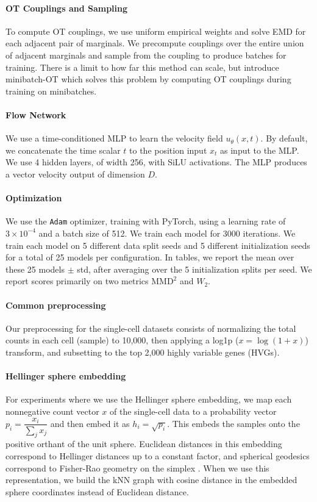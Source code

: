 \paragraph{OT Couplings and Sampling}
To compute OT couplings, we use uniform empirical weights and solve EMD for each adjacent pair of marginals. We precompute couplings over the entire union of adjacent marginals and sample from the coupling to produce batches for training. There is a limit to how far this method can scale, but \citet{tongImprovingGeneralizingFlowbased2024} introduce minibatch-OT which solves this problem by computing OT couplings during training on minibatches.

\paragraph{Flow Network}
We use a time-conditioned MLP to learn the velocity field $u_\theta(x, t)$. By default, we concatenate the time scalar $t$ to the position input $x_t$ as input to the MLP. We use 4 hidden layers, of width 256, with SiLU activations. The MLP produces a vector velocity output of dimension $D$.

\paragraph{Optimization}
We use the \texttt{Adam} optimizer, training with PyTorch, using a learning rate of $3\times 10^{-4}$ and a batch size of 512. We train each model for 3000 iterations. We train each model on 5 different data split seeds and 5 different initialization seeds for a total of 25 models per configuration. In tables, we report the mean over these 25 models $\pm$ std, after averaging over the 5 initialization splits per seed. We report scores primarily on two metrics $\mathrm{MMD}^2$ and $W_2$.

\paragraph{Common preprocessing} Our preprocessing for the single-cell datasets consists of normalizing the total counts in each cell (sample) to 10,000, then applying a log1p ($x=\log(1+x)$) transform, and subsetting to the top 2,000 highly variable genes (HVGs).

\paragraph{Hellinger sphere embedding}
For experiments where we use the Hellinger sphere embedding, we map each nonnegative count vector $x$ of the single-cell data to a probability vector $p_i=\dfrac{x_i}{\sum_j x_j}$ and then embed it as $h_i=\sqrt{p_i}$. This embeds the samples onto the positive orthant of the unit sphere. Euclidean distances in this embedding correspond to Hellinger distances up to a constant factor, and spherical geodesics correspond to Fisher-Rao geometry on the simplex \cite{davisFisherFlowMatching}. When we use this representation, we build the kNN graph with cosine distance in the embedded sphere coordinates instead of Euclidean distance.

